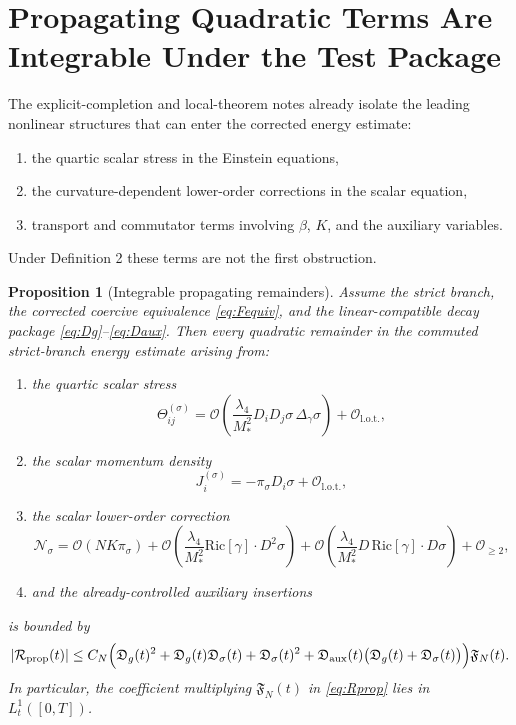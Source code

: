 \documentclass[11pt]{article}
\newtheorem{proposition}{Proposition}
\begin{document}
\section{Propagating Quadratic Terms Are Integrable Under the Test Package}

The explicit-completion and local-theorem notes already isolate the leading nonlinear structures that can enter the corrected energy estimate:
\begin{enumerate}
    \item the quartic scalar stress in the Einstein equations,
    \item the curvature-dependent lower-order corrections in the scalar equation,
    \item transport and commutator terms involving \(\beta\), \(K\), and the auxiliary variables.
\end{enumerate}
Under Definition 2 these terms are not the first obstruction.

\begin{proposition}[Integrable propagating remainders]
Assume the strict branch, the corrected coercive equivalence \eqref{eq:Fequiv}, and the linear-compatible decay package \eqref{eq:Dg}--\eqref{eq:Daux}. Then every quadratic remainder in the commuted strict-branch energy estimate arising from:
\begin{enumerate}
    \item the quartic scalar stress
    \[
    \Theta_{ij}^{(\sigma)}
    =
    \mathcal O\!\left(\frac{\lambda_4}{M_\ast^2}D_iD_j\sigma\,\Delta_\gamma\sigma\right)
    + \mathcal O_{\mathrm{l.o.t.}},
    \]
    \item the scalar momentum density
    \[
    J_i^{(\sigma)} = -\pi_\sigma D_i\sigma + \mathcal O_{\mathrm{l.o.t.}},
    \]
    \item the scalar lower-order correction
    \[
    \mathcal N_\sigma
    =
    \mathcal O(NK\pi_\sigma)
    + \mathcal O\!\left(\frac{\lambda_4}{M_\ast^2}\mathrm{Ric}[\gamma]\cdot D^2\sigma\right)
    + \mathcal O\!\left(\frac{\lambda_4}{M_\ast^2}D\,\mathrm{Ric}[\gamma]\cdot D\sigma\right)
    + \mathcal O_{\ge 2},
    \]
    \item and the already-controlled auxiliary insertions
\end{enumerate}
is bounded by
\begin{equation}
|\mathcal R_{\mathrm{prop}}(t)|
\le
C_N\Bigl(
\mathfrak D_g(t)^2
+ \mathfrak D_g(t)\mathfrak D_\sigma(t)
+ \mathfrak D_\sigma(t)^2
+ \mathfrak D_{\mathrm{aux}}(t)\bigl(\mathfrak D_g(t)+\mathfrak D_\sigma(t)\bigr)
\Bigr)\mathfrak F_N(t).
\label{eq:Rprop}
\end{equation}
In particular, the coefficient multiplying \(\mathfrak F_N(t)\) in \eqref{eq:Rprop} lies in \(L_t^1([0,T])\).
\end{proposition}
\end{document}
